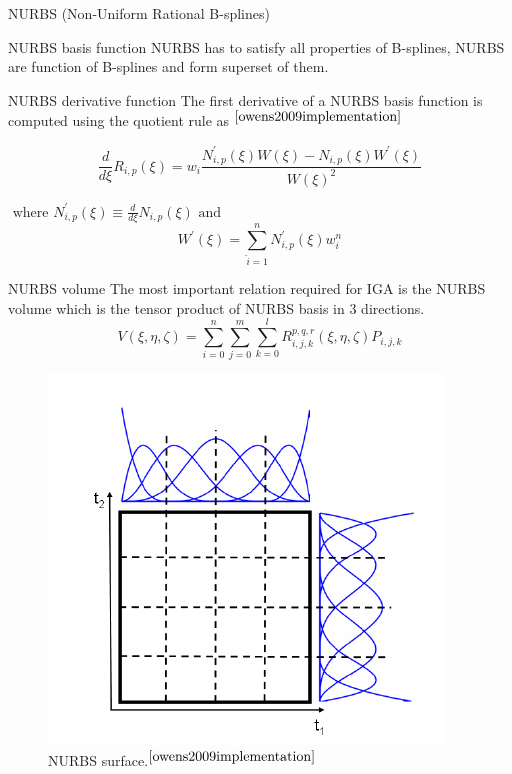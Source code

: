 \documentclass[a4paper,12pt,times]{article}
\begin{document}
\begin{section}{NURBS (Non-Uniform Rational B-splines) }
\begin{subsection}{NURBS basis function}
NURBS has to satisfy all properties of B-splines, NURBS are function of B-splines and form superset of them.

\end{subsection}

\begin{subsection}{NURBS derivative function}
The first derivative of a NURBS basis function is computed using the quotient rule as $^{\cite{owens2009implementation}}$

\begin{equation}\label{NURBS derivatives}
\frac{d}{d \xi} R_{i, p}(\xi)=w_{i} \frac{N_{i, p}^{\prime}(\xi) W(\xi)-N_{i, p}(\xi) W^{\prime}(\xi)}{W(\xi)^{2}}
\end{equation}

$\text { where } N_{i, p}^{\prime}(\xi) \equiv \frac{d}{d \xi} N_{i, p}(\xi) \text { and }$
\begin{equation}\label{weights}
W^{\prime}(\xi)=\sum_{\hat{i}=1}^{n} N_{i, p}^{\prime}(\xi) w_{i}^{n}
\end{equation}
\end{subsection}

\begin{subsection}{NURBS volume}
The most important relation required for IGA is the NURBS volume which is the tensor product of NURBS basis in 3 directions.
\begin{equation}\label{NURBS volume}
V(\xi, \eta, \zeta)=\sum_{i=0}^{n} \sum_{j=0}^{m} \sum_{k=0}^{l} R_{i, j, k}^{p, q, r}(\xi, \eta, \zeta) P_{i, j, k}
\end{equation}

\begin{figure}[h!]
\centering
\includegraphics[width=0.75\linewidth]{NURBS_2D_surface.png}
\caption{ NURBS surface.$^{\cite{owens2009implementation}}$}
\label{fig:NURBS surface}
\end{figure}


\end{subsection}
\end{section}
\end{document}
